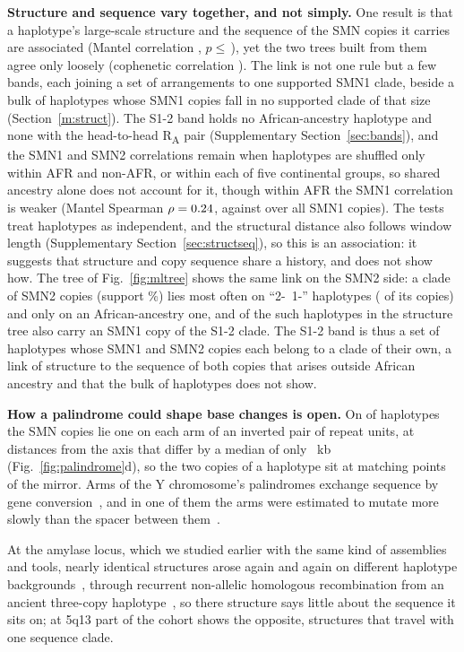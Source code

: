 \documentclass[10pt]{article}
\newcommand{\RU}[1]{R\textsubscript{#1}}%
\begin{document}
\textbf{Structure and sequence vary together, and not simply.} One result is that a haplotype's
large-scale structure and the sequence of the SMN copies it carries are associated (Mantel correlation \mantelAll, $p\le$\,\mantelP),
yet the two trees built from them agree only loosely (cophenetic correlation \cophenetic). The link is not one rule but
a few bands, each joining a set of arrangements to one supported SMN1 clade, beside a bulk of haplotypes whose SMN1
copies fall in no supported clade of that size (Section~\ref{m:struct}). The S1-2 band holds no African-ancestry haplotype and none with the head-to-head \RU{A} pair (Supplementary Section~\ref{sec:bands}), and the SMN1
and SMN2 correlations remain when haplotypes are shuffled only within AFR and non-AFR, or within each of five continental groups, so shared ancestry alone does
not account for it, though within AFR the SMN1 correlation is weaker (Mantel Spearman $\rho=0.24$, against \mOneR{} over all SMN1 copies). The tests treat haplotypes as
independent, and the structural distance also follows window length (Supplementary Section~\ref{sec:structseq}), so this is an
association: it suggests that structure and copy sequence share a history, and does not show how. The tree of Fig.~\ref{fig:mltree} shows the same link on the SMN2 side: a clade of \sTwoClN{} SMN2 copies (support \sTwoClSup\%) lies most often on ``2-~1-'' haplotypes (\sTwoClTwoMinusOneMinus{} of its \sTwoClN{} copies) and only \sTwoClAfr{} on an African-ancestry one, and \sTwoClWithSOneTwo{} of the \sTwoClHaps{} such haplotypes in the structure tree also carry an SMN1 copy of the S1-2 clade. The S1-2 band is thus a set of haplotypes whose SMN1 and SMN2 copies each belong to a clade of their own, a link of structure to the sequence of both copies that arises outside African ancestry and that the bulk of haplotypes does not show.

\textbf{How a palindrome could shape base changes is open.} On \palPair{} of \palHaps{} haplotypes the SMN copies lie one
on each arm of an inverted pair of repeat units, at distances from the axis that differ by a median of only
\palMirror{}~kb (Fig.~\ref{fig:palindrome}d), so the two copies of a haplotype sit at matching points of the mirror. Arms of the Y chromosome's
palindromes exchange sequence by gene conversion~\cite{rozen2003}, and in one of them the arms were estimated to
mutate more slowly than the spacer between them~\cite{bonito2021}.

At the amylase locus, which we studied earlier with
the same kind of assemblies and tools, nearly identical structures arose again and again on different haplotype
backgrounds~\cite{bolognini2024}, through recurrent non-allelic homologous recombination from an ancient three-copy
haplotype~\cite{yilmaz2024}, so there structure says little about the sequence it sits on; at 5q13
part of the cohort shows the opposite, structures that travel with one sequence clade.
\end{document}
